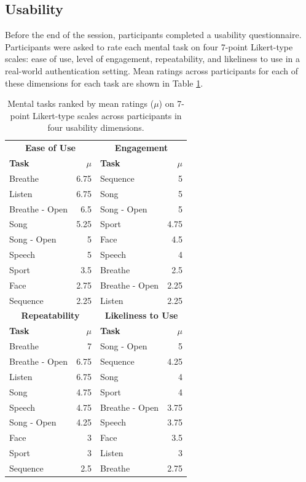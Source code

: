 \documentclass[a4paper,twoside]{article}
\begin{document}
\subsection{Usability}

\noindent Before the end of the session, participants completed a usability questionnaire. Participants were asked to rate each mental task on four 7-point Likert-type scales: ease of use, level of engagement, repeatability, and likeliness to use in a real-world authentication setting. Mean ratings across participants for each of these dimensions for each task are shown in Table \ref{tab:usability}.

\begin{table}
\caption{Mental tasks ranked by mean ratings (\(\mu\)) on 7-point Likert-type scales across participants in four usability dimensions.}
\label{tab:usability}
\begin{center}
\begin{tabular}{lrlr}
 \hline
\multicolumn{2}{|c|}{\textbf{Ease of Use}} & \multicolumn{2}{|c|}{\textbf{Engagement}}\\
\textbf{Task} & \textbf{\(\mu\)} & \textbf{Task} & \textbf{\(\mu\)}\\
 \hline
Breathe	& 6.75 & Sequence & 5\\
Listen & 6.75 &	Song & 5\\
Breathe - Open & 6.5 & Song - Open & 5\\
Song & 5.25	& Sport & 4.75\\
Song - Open & 5 & Face & 4.5\\
Speech & 5 & Speech & 4\\
Sport & 3.5 & Breathe & 2.5\\
Face & 2.75 & Breathe - Open & 2.25\\
Sequence & 2.25 & Listen & 2.25\\
 \hline
\multicolumn{2}{|c|}{\textbf{Repeatability}} & \multicolumn{2}{|c|}{\textbf{Likeliness to Use}}\\
\textbf{Task} & \textbf{\(\mu\)} & \textbf{Task} & \textbf{\(\mu\)}\\
 \hline
Breathe & 7	& Song - Open & 5\\
Breathe - Open & 6.75 & Sequence & 4.25\\
Listen & 6.75 & Song & 4\\
Song & 4.75 & Sport & 4\\
Speech & 4.75 & Breathe - Open & 3.75\\
Song - Open & 4.25 & Speech & 3.75\\
Face & 3 & Face & 3.5\\
Sport & 3 & Listen & 3\\
Sequence & 2.5 & Breathe & 2.75\\
\hline
\end{tabular}
\end{center}
\end{table}
\end{document}
